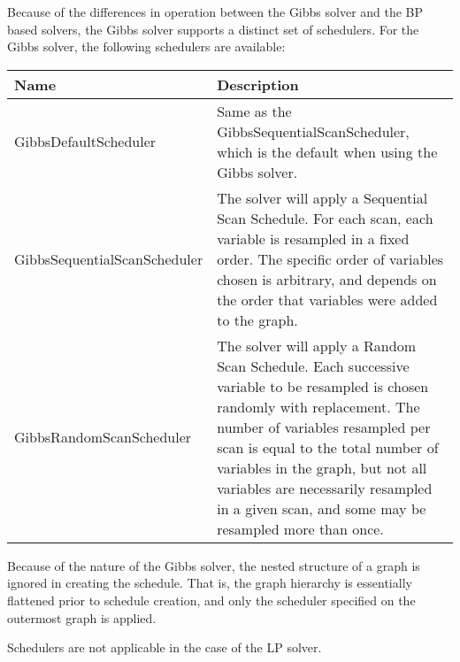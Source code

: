 Because of the differences in operation between the Gibbs solver and the BP based solvers, the Gibbs solver supports a distinct set of schedulers.  For the Gibbs solver, the following schedulers are available:

\begin{tabular}{l p{4in}}
\textbf{Name} & \textbf{Description} \\ \hline \hline
%
\textsf{GibbsDefaultScheduler} & Same as the GibbsSequentialScanScheduler, which is the default when using the Gibbs solver. \\ \hline
%
\textsf{GibbsSequentialScanScheduler} & The solver will apply a Sequential Scan Schedule.  For each scan, each variable is resampled in a fixed order.  The specific order of variables chosen is arbitrary, and depends on the order that variables were added to the graph. \\ \hline
%
\textsf{GibbsRandomScanScheduler} & The solver will apply a Random Scan Schedule.  Each successive variable to be resampled is chosen randomly with replacement.  The number of variables resampled per scan is equal to the total number of variables in the graph, but not all variables are necessarily resampled in a given scan, and some may be resampled more than once. \\ \hline
%
\end{tabular}

Because of the nature of the Gibbs solver, the nested structure of a graph is ignored in creating the schedule.  That is, the graph hierarchy is essentially flattened prior to schedule creation, and only the scheduler specified on the outermost graph is applied.

Schedulers are not applicable in the case of the LP solver.

